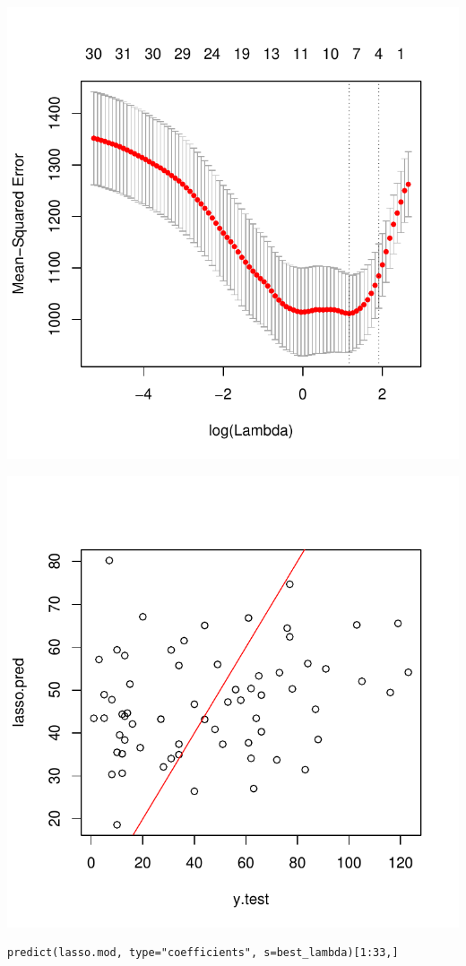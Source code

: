 \documentclass[]{report}
\begin{document}
\begin{center}
	\includegraphics[width=0.8\linewidth]{Figures/lasso_mse.pdf}
\end{center}

\begin{center}
	\includegraphics[width=0.8\linewidth]{Figures/lasso_predicted.pdf}
\end{center}

\begin{lstlisting}
predict(lasso.mod, type="coefficients", s=best_lambda)[1:33,]
\end{lstlisting}
\end{document}
